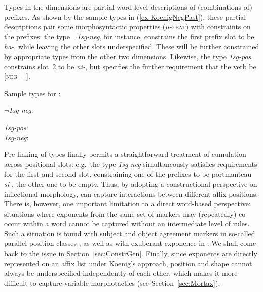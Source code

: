 \documentclass[output=paper
 	        ,biblatex
                ,babelshorthands
                ,newtxmath
                ,draftmode
                ,colorlinks, citecolor=brown
]{langscibook}
\begin{document}
Types in the dimensions are partial word-level descriptions of
(combinations of) prefixes. As shown by the sample types in (\ref{ex-KoenigNegPast}), these partial descriptions pair some
morphosyntactic properties (\textsc{$\mu$-feat}) with constraints on
the prefixes: the type \textit{$\neg$1sg-neg}, for instance, constrains the
first prefix slot to be \textit{ha-}, while leaving the other slots
underspecified. These will be further constrained by appropriate types
from the other two dimensions. Likewise, the type \textit{1sg-pos},
constrains slot~2 to be \textit{ni-}, but specifies the further
requirement that the verb be \textsc{[neg~$-$]}.    

\begin{exe}
\ex\label{ex-KoenigNegPast}
Sample types for :
\begin{xlist}
\ex \textit{$\neg$1sg-neg}:\\

\ex \textit{1sg-pos}:\\
\ex \textit{1sg-neg}:\\
\zl


Pre-linking of types finally permits a straightforward treatment of
cumulation across positional slots: e.g.\ the type \textit{1sg-neg}
simultaneously satisfies requirements for the first and second slot,
constraining one of the prefixes to be portmanteau \textit{si-}, the
other one to be empty. Thus, by adopting a constructional perspective
on inflectional morphology, \citet{Koenig99} can capture interactions
between different affix positions. There is, however, one important
limitation to a direct word-based perspective: situations where
exponents from the same set of markers may (repeatedly) co-occur
within a word cannot be captured without an intermediate level of
rules. Such a situation is found with subject and object agreement
markers in  \emdash so-called parallel position classes
\citep{Stump93,Crysmann:Bonami:2016} \emdash, as well as with exuberant
exponence in  \citep{Harris09,Crysmann:2018:Batsbi}. We shall
come back to the issue in Section~\ref{sec:ConstrGen}. Finally, since
exponents are directly represented on an affix list under Koenig's
approach, position and shape cannot always be underspecified
independently of each other, which makes it more difficult to
capture variable morphotactics (see Section~\ref{sec:Mortax}).



\end{xlist}
\end{exe}
\end{document}
